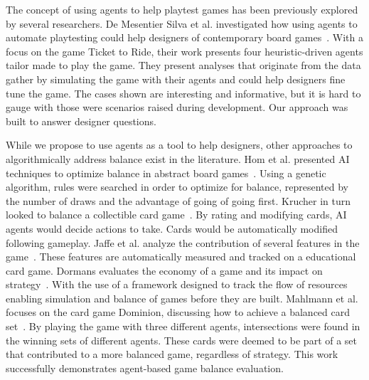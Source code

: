 \documentclass[letterpaper]{article} %
\begin{document}
The concept of using agents to help playtest games has been previously explored by several researchers. De Mesentier Silva et al. investigated how using agents to automate playtesting could help designers of contemporary board games~\cite{de2017modernboardgameworkshopai,de2017contemporaryboardgameai,de2018EvolvingMaps}. With a focus on the game Ticket to Ride, their work presents four heuristic-driven agents tailor made to play the game. They present analyses that originate from the data gather by simulating the game with their agents and could help designers fine tune the game. The cases shown are interesting and informative, but it is hard to gauge with those were scenarios raised during development. Our approach was built to answer designer questions.

While we propose to use agents as a tool to help designers, other approaches to algorithmically address balance exist in the literature. Hom et al. presented AI techniques to optimize balance in abstract board games~\cite{[1]hom2007automatic}. Using a genetic algorithm, rules were searched in order to optimize for balance, represented by the number of draws and the advantage of going of going first. Krucher in turn looked to balance a collectible card game~\cite{[4]r2014}. By rating and modifying cards, AI agents would decide actions to take. Cards would be automatically modified following gameplay. Jaffe et al. analyze the contribution of several features in the game~\cite{[3]jaffe2012evaluating}. These features are automatically measured and tracked on a educational card game. Dormans evaluates the economy of a game and its impact on strategy~\cite{dormans2011simulating}. With the use of a framework designed to track the flow of resources enabling simulation and balance of games before they are built. Mahlmann et al. focuses on the card game Dominion, discussing how to achieve a balanced card set~\cite{[2]mahlmann2012evolving}. By playing the game with three different agents, intersections were found in the winning sets of different agents. These cards were deemed to be part of a set that contributed to a more balanced game, regardless of strategy. This work successfully demonstrates agent-based game balance evaluation.
\end{document}
